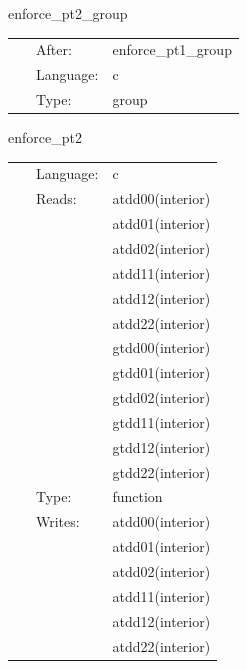 \vspace{5mm}


\hspace{5mm} enforce\_pt2\_group 

\hspace{5mm}{\it group for function `enforce\_pt2`. generated by einsteinengine. } 


\hspace{5mm}

 \begin{tabular*}{160mm}{cll} 
~ & After:  & enforce\_pt1\_group \\ 
~ & Language:  & c \\ 
~ & Type:  & group \\ 
\end{tabular*} 


\vspace{5mm}


\hspace{5mm} enforce\_pt2 

\hspace{5mm}{\it function `enforce\_pt2` generated by einsteinengine. } 


\hspace{5mm}

 \begin{tabular*}{160mm}{cll} 
~ & Language:  & c \\ 
~ & Reads:  & atdd00(interior) \\ 
~& ~ &atdd01(interior)\\ 
~& ~ &atdd02(interior)\\ 
~& ~ &atdd11(interior)\\ 
~& ~ &atdd12(interior)\\ 
~& ~ &atdd22(interior)\\ 
~& ~ &gtdd00(interior)\\ 
~& ~ &gtdd01(interior)\\ 
~& ~ &gtdd02(interior)\\ 
~& ~ &gtdd11(interior)\\ 
~& ~ &gtdd12(interior)\\ 
~& ~ &gtdd22(interior)\\ 
~ & Type:  & function \\ 
~ & Writes:  & atdd00(interior) \\ 
~& ~ &atdd01(interior)\\ 
~& ~ &atdd02(interior)\\ 
~& ~ &atdd11(interior)\\ 
~& ~ &atdd12(interior)\\ 
~& ~ &atdd22(interior)\\ 
\end{tabular*} 



